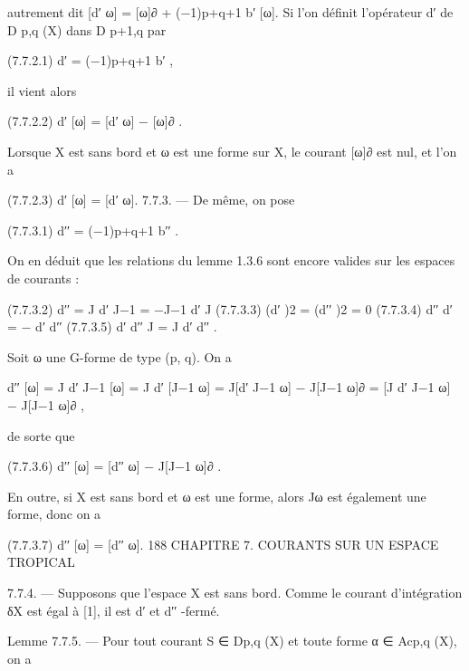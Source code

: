 \documentclass[
  10pt,
]{article}
\newenvironment{Shaded}{}{}
\newcommand{\NormalTok}[1]{#1}
\begin{document}
\begin{Shaded}
\begin{Highlighting}[]
\NormalTok{autrement dit}
\NormalTok{                                     [d′ ω] = [ω]∂ + (−1)p+q+1 b′ [ω].}
\NormalTok{Si l’on définit l’opérateur d′ de D p,q (X) dans D p+1,q par}

\NormalTok{(7.7.2.1)                                   d′ = (−1)p+q+1 b′ ,}

\NormalTok{il vient alors}

\NormalTok{(7.7.2.2)                                 d′ [ω] = [d′ ω] − [ω]∂ .}

\NormalTok{Lorsque X est sans bord et ω est une forme sur X, le courant [ω]∂ est nul, et l’on a}

\NormalTok{(7.7.2.3)                                     d′ [ω] = [d′ ω].}
\NormalTok{7.7.3. — De même, on pose}

\NormalTok{(7.7.3.1)                                  d′′ = (−1)p+q+1 b′′ .}

\NormalTok{On en déduit que les relations du lemme 1.3.6 sont encore valides sur les espaces de}
\NormalTok{courants :}

\NormalTok{(7.7.3.2)                              d′′ = J d′ J−1 = −J−1 d′ J}
\NormalTok{(7.7.3.3)                                   (d′ )2 = (d′′ )2 = 0}
\NormalTok{(7.7.3.4)                                    d′′ d′ = − d′ d′′}
\NormalTok{(7.7.3.5)                                    d′ d′′ J = J d′ d′′ .}

\NormalTok{  Soit ω une G{-}forme de type (p, q). On a}

\NormalTok{                     d′′ [ω] = J d′ J−1 [ω] = J d′ [J−1 ω] = J[d′ J−1 ω] − J[J−1 ω]∂}
\NormalTok{                           = [J d′ J−1 ω] − J[J−1 ω]∂ ,}

\NormalTok{de sorte que}

\NormalTok{(7.7.3.6)                              d′′ [ω] = [d′′ ω] − J[J−1 ω]∂ .}

\NormalTok{En outre, si X est sans bord et ω est une forme, alors Jω est également une forme, donc}
\NormalTok{on a}

\NormalTok{(7.7.3.7)                                    d′′ [ω] = [d′′ ω].}
\NormalTok{188                  CHAPITRE 7. COURANTS SUR UN ESPACE TROPICAL}

\NormalTok{7.7.4. — Supposons que l’espace X est sans bord. Comme le courant d’intégration δX}
\NormalTok{est égal à [1], il est d′ et d′′ {-}fermé.}

\NormalTok{Lemme 7.7.5. — Pour tout courant S ∈ Dp,q (X) et toute forme α ∈ Acp,q (X), on a}


\end{Highlighting}
\end{Shaded}
\end{document}
